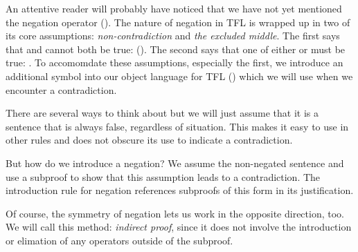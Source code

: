 An attentive reader will probably have noticed that we have not yet mentioned
the negation operator (\enot). The nature of negation in TFL is wrapped up in
two of its core assumptions: \emph{non-contradiction} and \emph{the excluded
middle}. The first says that \ephi and \enot\ephi cannot both be true:
\enot(\ephi\eand\enot\ephi). The second says that one of either \ephi or
\enot\ephi must be true: \ephi\eor\enot\ephi. To accomomdate these assumptions,
especially the first, we introduce an additional symbol into our object
language for TFL (\ebot) which we will use when we encounter a contradiction.


\begin{fitchrule}
  \label{def:not-elimination-rule}
  \leavevmode
  \vspace{-0.9\baselineskip}
  \begin{fitchproof}
     {\enot\ephi}
     {\ephi}
     {\ebot}      
  \end{fitchproof}
\end{fitchrule}

There are several ways to think about \ebot but we will just assume that it is
a sentence that is always false, regardless of situation. This makes it easy
to use in other rules and does not obscure its use to indicate a contradiction.

But how do we introduce a negation? We assume the non-negated sentence and use
a subproof to show that this assumption leads to a contradiction. The
introduction rule for negation references subproofs of this form in its
justification.

\begin{fitchrule}
  \label{def:not-introduction-rule}
  \leavevmode
  \vspace{-0.9\baselineskip}
  \begin{fitchproof}
    \open
     {\ephi}      
     {\ebot}
    \close
     {\enot\ephi} 
  \end{fitchproof}
\end{fitchrule}

Of course, the symmetry of negation lets us work in the opposite direction,
too. We will call this method: \emph{indirect proof}, since it does not involve
the introduction or elimation of any operators outside of the subproof.

\begin{fitchrule}
  \label{def:indirect-proof-rule}
  \leavevmode
  \vspace{-0.9\baselineskip}
  \begin{fitchproof}
    \open
     {\enot\ephi} 
     {\ebot}
    \close
     {\ephi}      
  \end{fitchproof}
\end{fitchrule}


